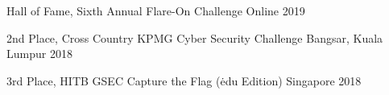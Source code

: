



\begin{cvhonors}

  \cvhonor
    {Hall of Fame,} 
    {Sixth Annual Flare-On Challenge} 
    {Online} 
    {2019}

  \cvhonor
    {2nd Place,} 
    {Cross Country KPMG Cyber Security Challenge} 
    {Bangsar, Kuala Lumpur} 
    {2018}

  \cvhonor
    {3rd Place,} 
    {HITB GSEC Capture the Flag (\.edu Edition)} 
    {Singapore} 
    {2018} 

\end{cvhonors}




